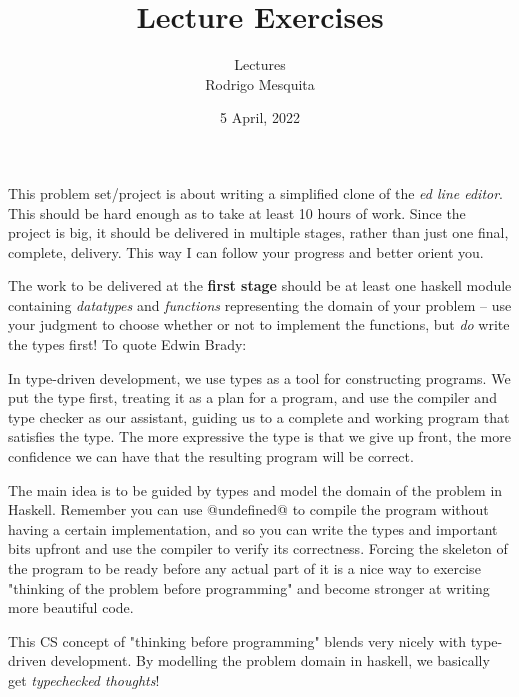 \documentclass[a4paper,10pt]{article}
\title{Lecture Exercises}
\author{Lectures \\ Rodrigo Mesquita}
\date{5 April, 2022}
\begin{document}
\maketitle


This problem set/project is about writing a simplified clone of the \emph{ed
line editor}. This should be hard enough as to take at least 10 hours of work.
Since the project is big, it should be delivered in multiple stages, rather
than just one final, complete, delivery. This way I can follow your progress
and better orient you.

The work to be delivered at the \textbf{first stage} should be at least one
haskell module containing \emph{datatypes} and \emph{functions} representing
the domain of your problem -- use your judgment to choose whether or not to
implement the functions, but \emph{do} write the types first! To quote Edwin
Brady:

\begin{displayquote}
In type-driven development, we use types as a tool for constructing
programs. We put the type first, treating it as a plan for a program, and use
the compiler and type checker as our assistant, guiding us to a complete and
working program that satisfies the type. The more expressive the type is that
we give up front, the more confidence we can have that the resulting program
will be correct.
\end{displayquote}

The main idea is to be guided by types and model the domain of the problem in
Haskell. Remember you can use @undefined@ to compile the program without having
a certain implementation, and so you can write the types and important bits
upfront and use the compiler to verify its correctness. Forcing the skeleton of
the program to be ready before any actual part of it is a nice way to exercise
"thinking of the problem before programming" and become stronger at writing
more beautiful code.

This CS concept of "thinking before programming" blends very nicely with
type-driven development. By modelling the problem domain in haskell, we
basically get \emph{typechecked thoughts}!
\end{document}
